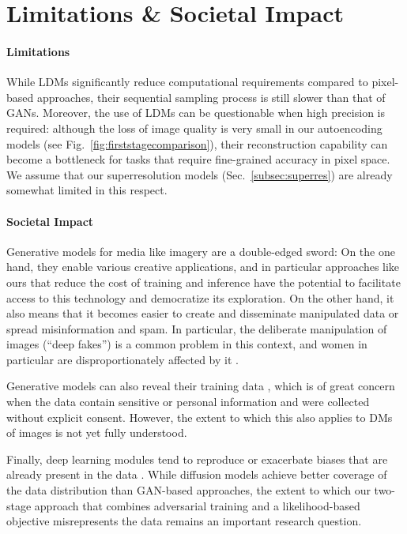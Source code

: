 \documentclass[10pt,twocolumn,letterpaper]{article}
\begin{document}
\vspace{-0.5em}
\section{Limitations \& Societal Impact}
\label{sec:limitations}
\enlargethispage{\baselineskip}
\paragraph{Limitations}
While LDMs significantly reduce computational requirements compared to pixel-based approaches, 
their sequential sampling process is still slower than that of GANs.
Moreover, the use of LDMs can be questionable when high precision is required: 
although the loss of image quality is very small in our  autoencoding models (see Fig.~\ref{fig:firststagecomparison}), 
their reconstruction capability can become a bottleneck for tasks that require fine-grained accuracy in pixel space. 
We assume that our superresolution models (Sec.~\ref{subsec:superres}) are already somewhat limited in this respect.

\vspace{-1.0em}
\paragraph{Societal Impact}
Generative models for media like imagery are a double-edged sword: On the one hand, they enable various creative applications, 
and in particular approaches like ours that reduce the cost of training and inference have the potential 
to facilitate access to this technology and democratize its exploration. 
On the other hand, it also means that it becomes easier to create and disseminate manipulated data or spread misinformation and spam. 
In particular, the deliberate manipulation of images (``deep fakes'') is a common problem in this context, 
and women in particular are disproportionately affected by it \cite{denton2021workshop, franks2018sex}.

Generative models can also reveal their training data \cite{carlini2021extracting, tinsley2021face}, 
which is of great concern when the data contain sensitive or personal information 
and were collected without explicit consent. 
However, the extent to which this also applies to DMs of images is not yet fully understood.

Finally, deep learning modules tend to reproduce or exacerbate biases that are already present in the data \cite{torralba2011unbiased, jain2020imperfect, esser2020note}. 
While diffusion models achieve better coverage of the data distribution than \eg GAN-based approaches, 
the extent to which our two-stage approach that combines adversarial training and a likelihood-based objective 
misrepresents the data remains an important research question.
\end{document}
